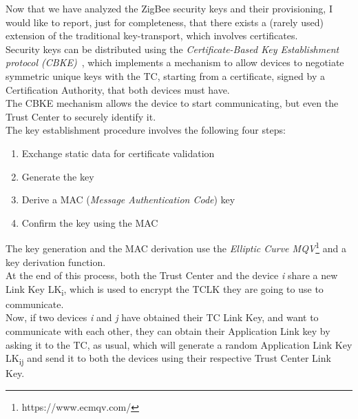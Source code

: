 \documentclass[12pt]{report}
\begin{document}
\begin{itemize}

\end{itemize}

Now that we have analyzed the ZigBee security keys and their provisioning, I would like to report, just for completeness, that there exists a (rarely used) extension of the traditional key-transport, which involves certificates.\\
Security keys can be distributed using the \emph{Certificate-Based Key Establishment protocol (CBKE)}~\cite{zigbeesecbasics2}, which implements a mechanism to allow devices to negotiate symmetric unique keys with the TC, starting from a certificate, signed by a Certification Authority, that both devices must have.\\
The CBKE mechanism allows the device to start communicating, but even the Trust Center to securely identify it.\\
The key establishment procedure involves the following four steps:

\begin{enumerate}
\setlength{\itemindent}{+5mm}
\item Exchange static data for certificate validation
\item Generate the key
\item Derive a MAC (\emph{Message Authentication Code}) key
\item Confirm the key using the MAC
 \end{enumerate}

The key generation and the MAC derivation use the \emph{Elliptic Curve MQV}\footnote{https://www.ecmqv.com/} and a key derivation function.\\
At the end of this process, both the Trust Center and the device \emph{i} share a new Link Key LK\textsubscript{i}, which is used to encrypt the TCLK they are going to use to communicate.\\
Now, if two devices \emph{i} and \emph{j} have obtained their TC Link Key, and want to communicate with each other, they can obtain their Application Link key by asking it to the TC, as usual, which will generate a random Application Link Key LK\textsubscript{ij} and send it to both the devices using their respective Trust Center Link Key.\\
\end{document}
